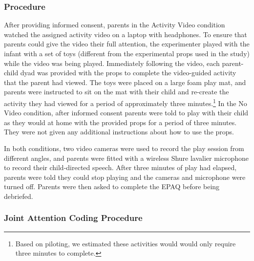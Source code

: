 \documentclass[
  english,
  man]{apa6}
\begin{document}
\hypertarget{procedure}{%
\subsubsection{Procedure}\label{procedure}}

After providing informed consent, parents in the Activity Video condition watched the assigned activity video on a laptop with headphones.
To ensure that parents could give the video their full attention, the experimenter played with the infant with a set of toys (different from the experimental props used in the study) while the video was being played.
Immediately following the video, each parent-child dyad was provided with the props to complete the video-guided activity that the parent had viewed.
The toys were placed on a large foam play mat, and parents were instructed to sit on the mat with their child and re-create the activity they had viewed for a period of approximately three minutes.\footnote{Based on piloting, we estimated these activities would would only require three minutes to complete.}
In the No Video condition, after informed consent parents were told to play with their child as they would at home with the provided props for a period of three minutes.
They were not given any additional instructions about how to use the props.

In both conditions, two video cameras were used to record the play session from different angles, and parents were fitted with a wireless Shure lavalier microphone to record their child-directed speech.
After three minutes of play had elapsed, parents were told they could stop playing and the cameras and microphone were turned off.
Parents were then asked to complete the EPAQ before being debriefed.

\hypertarget{joint-attention-coding-procedure}{%
\subsubsection{Joint Attention Coding Procedure}\label{joint-attention-coding-procedure}}
\end{document}
